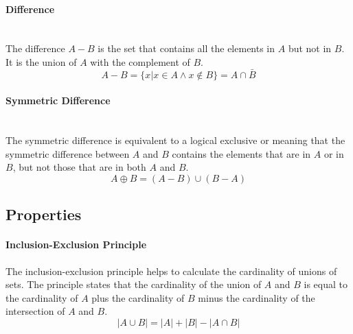 \documentclass[a4paper, 10pt]{article}
\begin{document}
\begin{multicols}{2}
\paragraph{Difference}\mbox{}\\
The difference \(A-B\) is the set that contains all the elements in \(A\) but not in \(B\). It is the union of \(A\) with the complement of \(B\).
\[ A-B = \{x|x\in A \land x\notin B\} = A\cap \bar{B} \]
\begin{center}
\end{center}
\end{multicols}
\paragraph{Symmetric Difference}\mbox{}\\
The symmetric difference is equivalent to a logical exclusive or meaning that the symmetric difference between \(A\) and \(B\) contains the elements that are in \(A\) or in \(B\), but not those that are in both \(A\) and \(B\).
\[ A\oplus B = (A-B)\cup(B-A) \]
\begin{center}
\end{center}

\newpage
\subsection{Properties}
\paragraph{Inclusion-Exclusion Principle}
The inclusion-exclusion principle helps to calculate the cardinality of unions of sets. The principle states that the cardinality of the union of \(A\) and \(B\) is equal to the cardinality of \(A\) plus the cardinality of \(B\) minus the cardinality of the intersection of \(A\) and \(B\).
\[ |A\cup B| = |A| + |B| - |A\cap B| \]
\end{document}
